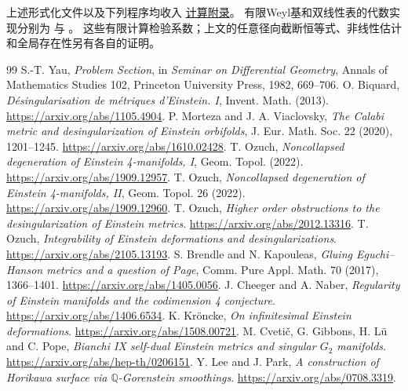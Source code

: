 \documentclass[UTF8,a4paper,11pt,fontset=fandol]{ctexart}
\numberwithin{equation}{section}
\theoremstyle{definition}
\begin{document}
上述形式化文件以及下列程序均收入
\href{../references/computations.md}{计算附录}。
有限Weyl基和双线性表的代数实现分别为
与
。
这些有限计算检验系数；上文的任意径向截断恒等式、非线性估计和全局存在性另有各自的证明。
\clearpage
\begin{thebibliography}{99}
 S.-T. Yau, \emph{Problem Section}, in \emph{Seminar on Differential Geometry}, Annals of Mathematics Studies 102, Princeton University Press, 1982, 669--706.
 O. Biquard, \emph{D\'esingularisation de m\'etriques d'Einstein. I}, Invent. Math. (2013). \url{https://arxiv.org/abs/1105.4904}.
 P. Morteza and J. A. Viaclovsky, \emph{The Calabi metric and desingularization of Einstein orbifolds}, J. Eur. Math. Soc. 22 (2020), 1201--1245. \url{https://arxiv.org/abs/1610.02428}.
 T. Ozuch, \emph{Noncollapsed degeneration of Einstein 4-manifolds, I}, Geom. Topol. (2022). \url{https://arxiv.org/abs/1909.12957}.
 T. Ozuch, \emph{Noncollapsed degeneration of Einstein 4-manifolds, II}, Geom. Topol. 26 (2022). \url{https://arxiv.org/abs/1909.12960}.
 T. Ozuch, \emph{Higher order obstructions to the desingularization of Einstein metrics}. \url{https://arxiv.org/abs/2012.13316}.
 T. Ozuch, \emph{Integrability of Einstein deformations and desingularizations}. \url{https://arxiv.org/abs/2105.13193}.
 S. Brendle and N. Kapouleas, \emph{Gluing Eguchi--Hanson metrics and a question of Page}, Comm. Pure Appl. Math. 70 (2017), 1366--1401. \url{https://arxiv.org/abs/1405.0056}.
 J. Cheeger and A. Naber, \emph{Regularity of Einstein manifolds and the codimension 4 conjecture}. \url{https://arxiv.org/abs/1406.6534}.
 K. Kr\"oncke, \emph{On infinitesimal Einstein deformations}. \url{https://arxiv.org/abs/1508.00721}.
 M. Cveti\v c, G. Gibbons, H. L\"u and C. Pope, \emph{Bianchi IX self-dual Einstein metrics and singular $G_2$ manifolds}. \url{https://arxiv.org/abs/hep-th/0206151}.
 Y. Lee and J. Park, \emph{A construction of Horikawa surface via $\mathbb Q$-Gorenstein smoothings}. \url{https://arxiv.org/abs/0708.3319}.
\end{thebibliography}
\end{document}

